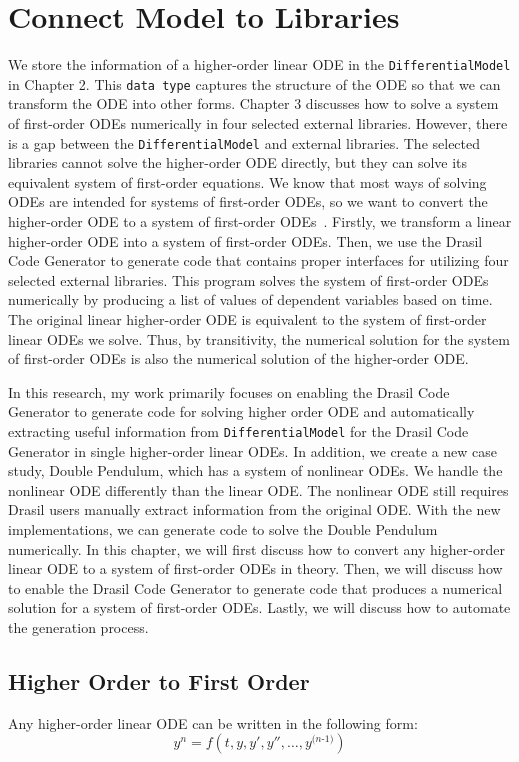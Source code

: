 \chapter{Connect Model to Libraries}
We store the information of a higher-order linear ODE in the \verb|DifferentialModel| in Chapter 2. This \verb|data type| captures the structure of the ODE so that we can transform the ODE into other forms. Chapter 3 discusses how to solve a system of first-order ODEs numerically in four selected external libraries. However, there is a gap between the \verb|DifferentialModel| and external libraries. The selected libraries cannot solve the higher-order ODE directly, but they can solve its equivalent system of first-order equations. We know that most ways of solving ODEs are intended for systems of first-order ODEs, so we want to convert the higher-order ODE to a system of first-order ODEs~\citep{converthigherode}. Firstly, we transform a linear higher-order ODE into a system of first-order ODEs. Then, we use the Drasil Code Generator to generate code that contains proper interfaces for utilizing four selected external libraries. This program solves the system of first-order ODEs numerically by producing a list of values of dependent variables based on time. The original linear higher-order ODE is equivalent to the system of first-order linear ODEs we solve. Thus, by transitivity, the numerical solution for the system of first-order ODEs is also the numerical solution of the higher-order ODE.

In this research, my work primarily focuses on enabling the Drasil Code Generator to generate code for solving higher order ODE and automatically extracting useful information from \verb|DifferentialModel| for the Drasil Code Generator in single higher-order linear ODEs. In addition, we create a new case study, Double Pendulum, which has a system of nonlinear ODEs. We handle the nonlinear ODE differently than the linear ODE. The nonlinear ODE still requires Drasil users manually extract information from the original ODE. With the new implementations, we can generate code to solve the Double Pendulum numerically. In this chapter, we will first discuss how to convert any higher-order linear ODE to a system of first-order ODEs in theory. Then, we will discuss how to enable the Drasil Code Generator to generate code that produces a numerical solution for a system of first-order ODEs. Lastly, we will discuss how to automate the generation process.

\section{Higher Order to First Order}
\label{se_hightofirst}
Any higher-order linear ODE can be written in the following form:
\begin{equation} \label{eq_isohighode}
  y^n = f (t, y, y', y'', \dots, y^{\textit{(n-1)}})
\end{equation}

